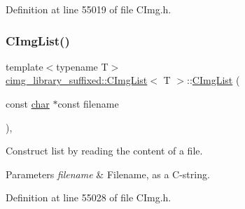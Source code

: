 Definition at line 55019 of file C\+Img.\+h.

\mbox{\label{structcimg__library__suffixed_1_1CImgList_ac394d73bac5abc6aec337bc457695bdc}} 
\subsubsection{\texorpdfstring{C\+Img\+List()}{CImgList()}\hspace{0.1cm}{\footnotesize\ttfamily [18/19]}}
{\footnotesize\ttfamily template$<$typename T$>$ \\
\hyperlink{structcimg__library__suffixed_1_1CImgList}{cimg\+\_\+library\+\_\+suffixed\+::\+C\+Img\+List}$<$ T $>$\+::\hyperlink{structcimg__library__suffixed_1_1CImgList}{C\+Img\+List} (\begin{DoxyParamCaption}\item[{const \hyperlink{classchar}{char} $\ast$const}]{filename }\end{DoxyParamCaption})\hspace{0.3cm}{\ttfamily [inline]}, {\ttfamily [explicit]}}



Construct list by reading the content of a file. 


\begin{DoxyParams}{Parameters}
{\em filename} & Filename, as a C-\/string. \\
\hline
\end{DoxyParams}


Definition at line 55028 of file C\+Img.\+h.

\mbox{\label{structcimg__library__suffixed_1_1CImgList_a32dbe3f9509eb41b2a18f4b68c737b39}} 
